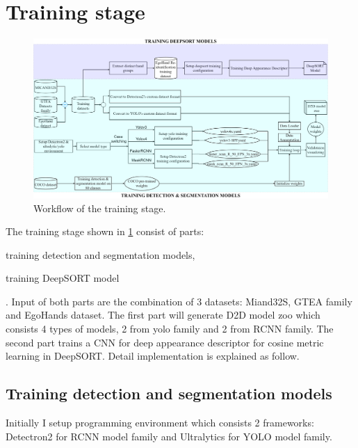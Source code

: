 \section{Training stage} \label{sec:trainingstage}
\begin{figure}[htbp]
	\centerline{\includegraphics[width=1\linewidth]{Figs/trainingStage.png}}
	\caption{Workflow of the training stage.}
	\label{fig:trainingstage}
\end{figure}
The training stage shown in \ref{fig:trainingstage} consist of parts: \begin{enumerate*}
	\item training detection and segmentation models,
	\item training DeepSORT model
\end{enumerate*}. Input of both parts are the combination of 3 datasets: Miand32S, GTEA family and EgoHands dataset. The first part will generate D2D model zoo which consists 4 types of models, 2 from yolo family and 2 from RCNN family. The second part trains a CNN for deep appearance descriptor for cosine metric learning \cite{DBLP:journals/corr/abs-1812-00442} in DeepSORT. Detail implementation is explained as follow.
\subsection{Training detection and segmentation models}
Initially I setup programming environment which consists 2 frameworks: Detectron2 \cite{wu2019detectron2} for RCNN model family and Ultralytics \cite{ultralytics} for YOLO model family.

